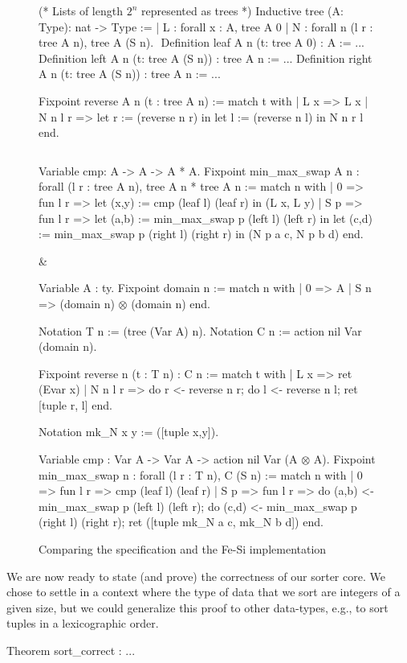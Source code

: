 \documentclass{llncs}
\begin{document}
\begin{figure}
  \centering
\begin{twolistings}
\begin{coq}
(* Lists of length $2^n$ represented as trees *)
Inductive tree (A: Type): nat -> Type :=
| L : forall x : A, tree A 0
| N : forall n (l r : tree A n), tree A (S n). 
$ $
Definition leaf  {A n} (t: tree A 0) : A := ...
Definition left  {A n} (t: tree A (S n)) : tree A n := ...
Definition right {A n} (t: tree A (S n)) : tree A n := ...

Fixpoint reverse {A} n (t : tree A n) :=
match t with 
| L x => L x
| N n l r => 
  let r := (reverse n r) in 
  let l := (reverse n l) in 
  N n r l
end.

$ $

Variable cmp: A -> A -> A * A.
Fixpoint min_max_swap {A} n : 
  forall (l r : tree A n), tree A n * tree A n :=
match n with 
| 0 => fun l r => 
  let (x,y) := cmp (leaf l) (leaf r) in (L x, L y)
| S p => fun l r => 
  let (a,b) := min_max_swap p (left l) (left r) in 
  let (c,d) := min_max_swap p (right l) (right r) in 
  (N p a c, N p b d)
end. 
\end{coq}
& $\quad$
\begin{coq}
Variable A : ty.        
Fixpoint domain n := match n with 
| 0 => A
| S n => (domain n) $\otimes$ (domain n)
end. 

Notation T n := (tree (Var A) n). 
Notation C n := action nil Var (domain n). 

Fixpoint reverse n (t : T n) : C n  :=
match t with 
| L x => ret (Evar x)
| N n l r => 
  do r <- reverse n r;
  do l <- reverse n l;
  ret [tuple r, l]
end.

Notation mk_N x y := ([tuple x,y]).

Variable cmp : Var A -> Var A -> action nil Var (A $\otimes$ A).
Fixpoint min_max_swap n : 
  forall (l r : T n), C (S n) :=
match n  with 
| 0 => fun l r => 
  cmp (leaf l) (leaf r)
| S p => fun l r => 
  do (a,b) <- min_max_swap p (left l) (left r);
  do (c,d) <- min_max_swap p (right l) (right r); 
  ret ([tuple mk_N a c, mk_N b d])
end.
\end{coq}
\end{twolistings}
  
  \caption{Comparing the specification and the Fe-Si implementation}
  \label{fig:reverse}
\end{figure}

We are now ready to state (and prove) the correctness of our sorter
core. We chose to settle in a context where the type of data that we
sort are integers of a given size, but we could generalize this proof
to other data-types, e.g., to sort tuples in a lexicographic order.
\begin{coq}
Theorem sort_correct : ...  
\end{coq}
\end{document}
